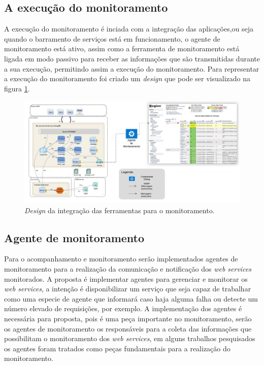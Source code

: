 \subsection{A execução do monitoramento}

A execução do monitoramento é inciada com a integração das aplicações,ou seja quando o barramento de serviços está em funcionamento, o agente de monitoramento está ativo, assim como a ferramenta de monitoramento está ligada em modo passivo para receber as informações que são transmitidas durante a sua execução, permitindo assim a execução do monitoramento. Para representar a execução do monitoramento foi criado um \textit{design} que pode ser visualizado na figura \ref{fun:fig:arqtProjeto}. 

\begin{figure}[h!]
	\begin{center}
	\includegraphics[scale = 0.45]{img/arqtProjeto.jpeg}
	\caption{\textit{Design} da integração das ferramentas para o monitoramento.}
	\label{fun:fig:arqtProjeto}
	\end{center}
\end{figure}



\subsection{Agente de monitoramento}

Para o acompanhamento e monitoramento serão implementados agentes de monitoramento para a realização da comunicação e notificação dos \textit{web services} monitorados. A proposta é implementar agentes para gerenciar e monitorar os \textit{web services}, a intenção é disponibilizar um serviço que seja capaz de trabalhar como uma especie de agente que informará caso haja alguma falha ou detecte um número elevado de requisições, por exemplo. A implementação dos agentes é necessária para proposta, pois é uma peça importante no monitoramento, serão os agentes de monitoramento os responsáveis para a coleta das informações que possibilitam o monitoramento dos \textit{web services}, em alguns trabalhos pesquisados os agentes foram tratados como peças fundamentais para a realização do monitoramento.       

